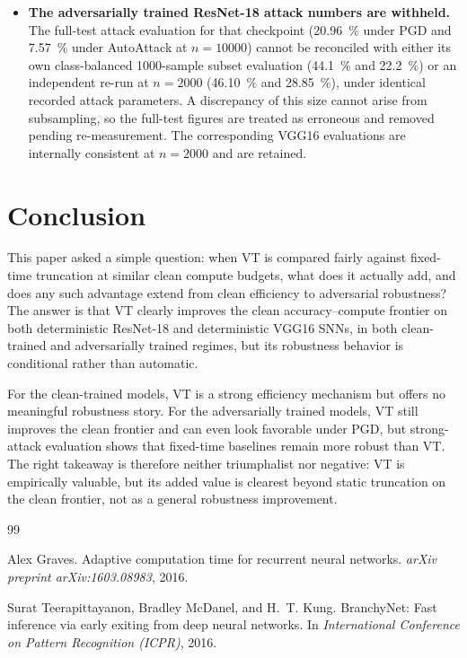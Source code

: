 \documentclass[11pt]{article}
\begin{document}
\begin{table}[t]
\begin{itemize}[leftmargin=1.3em]
\item \textbf{The adversarially trained ResNet-18 attack numbers are withheld.} The full-test attack evaluation for that checkpoint (\SI{20.96}{\percent} under PGD and \SI{7.57}{\percent} under AutoAttack at $n=\num{10000}$) cannot be reconciled with either its own class-balanced \num{1000}-sample subset evaluation (\SI{44.1}{\percent} and \SI{22.2}{\percent}) or an independent re-run at $n=\num{2000}$ (\SI{46.10}{\percent} and \SI{28.85}{\percent}), under identical recorded attack parameters. A discrepancy of this size cannot arise from subsampling, so the full-test figures are treated as erroneous and removed pending re-measurement. The corresponding VGG16 evaluations are internally consistent at $n=\num{2000}$ and are retained.
\end{itemize}

\section{Conclusion}
This paper asked a simple question: when VT is compared fairly against fixed-time truncation at similar clean compute budgets, what does it actually add, and does any such advantage extend from clean efficiency to adversarial robustness? The answer is that VT clearly improves the clean accuracy--compute frontier on both deterministic ResNet-18 and deterministic VGG16 SNNs, in both clean-trained and adversarially trained regimes, but its robustness behavior is conditional rather than automatic.

For the clean-trained models, VT is a strong efficiency mechanism but offers no meaningful robustness story. For the adversarially trained models, VT still improves the clean frontier and can even look favorable under PGD, but strong-attack evaluation shows that fixed-time baselines remain more robust than VT. The right takeaway is therefore neither triumphalist nor negative: VT is empirically valuable, but its added value is clearest beyond static truncation on the clean frontier, not as a general robustness improvement.

\begin{thebibliography}{99}

Alex Graves.
\newblock Adaptive computation time for recurrent neural networks.
\newblock \emph{arXiv preprint arXiv:1603.08983}, 2016.

Surat Teerapittayanon, Bradley McDanel, and H.~T. Kung.
\newblock BranchyNet: Fast inference via early exiting from deep neural networks.
\newblock In \emph{International Conference on Pattern Recognition (ICPR)}, 2016.


\end{thebibliography}
\end{table}
\end{document}
